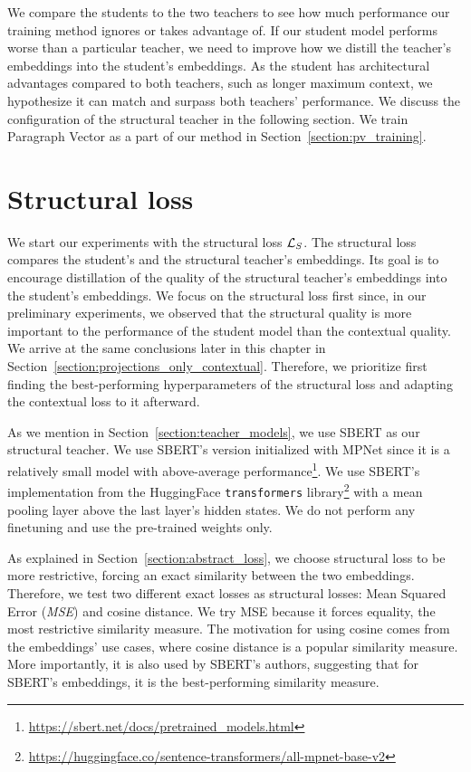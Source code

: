 We compare the students to the two teachers to see how much performance our
training method ignores or takes advantage of. If our student model performs
worse than a particular teacher, we need to improve how we distill the
teacher's embeddings into the student's embeddings. As the student has
architectural advantages compared to both teachers, such as longer maximum
context, we hypothesize it can match and surpass both teachers' performance. We
discuss the configuration of the structural teacher in the following section. We train Paragraph Vector as a part of our method in Section~\ref{section:pv_training}.

\section{Structural loss}\label{section:structural_loss}

We start our experiments with the structural loss $\mathcal{L}_S$. The structural
loss compares the student's and the structural teacher's embeddings. Its
goal is to encourage distillation of the quality of the structural teacher's
embeddings into the student's embeddings. We focus on the structural loss first
since, in our preliminary experiments, we observed that the structural quality
is more important to the performance of the student model than the contextual
quality. We arrive at the same conclusions later in this chapter in
Section~\ref{section:projections_only_contextual}. Therefore, we prioritize first finding the best-performing hyperparameters of the structural loss and
adapting the contextual loss to it afterward.

As we mention in Section~\ref{section:teacher_models}, we use SBERT
\citep{reimers2019sentence} as our structural teacher. We use SBERT's version
initialized with MPNet \citep{song2020mpnet} since it is a relatively small
model with above-average
performance\footnote{\url{https://sbert.net/docs/pretrained_models.html}}. We
use SBERT's implementation from the HuggingFace \texttt{transformers}
library\footnote{\url{https://huggingface.co/sentence-transformers/all-mpnet-base-v2}}
with a mean pooling layer above the last layer's hidden states. We do not
perform any finetuning and use the pre-trained weights only.

As explained in Section~\ref{section:abstract_loss}, we choose structural loss
to be more restrictive, forcing an exact similarity between the two embeddings.
Therefore, we test two different exact losses as structural losses: Mean Squared
Error (\emph{MSE}) and cosine distance. We try MSE because it forces
equality, the most restrictive similarity measure. The motivation for using
cosine comes from the embeddings' use cases, where cosine distance is a popular
similarity measure. More importantly, it is also used by SBERT's authors,
suggesting that for SBERT's embeddings, it is the best-performing similarity
measure.

